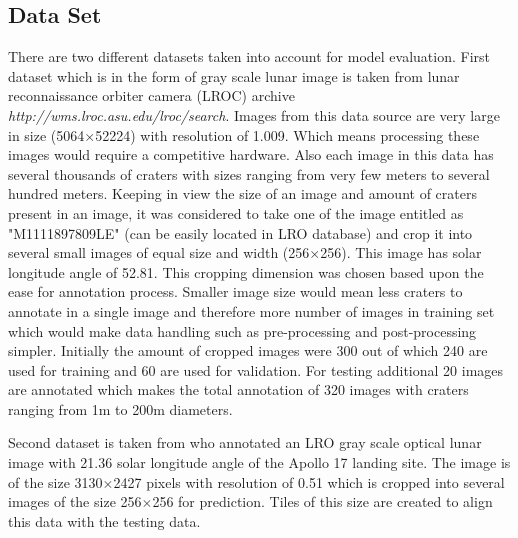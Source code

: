 \documentclass[11pt]{article}
\begin{document}
\subsection{Data Set}
There are two different datasets taken into account for model evaluation. First dataset which is in the form of gray scale lunar image is taken from lunar reconnaissance orbiter camera (LROC) archive \textit{http://wms.lroc.asu.edu/lroc/search}. Images from this data source are very large in size (5064$\times$52224) with resolution of 1.009. Which means processing these images would require a competitive hardware. Also each image in this data has several thousands of craters with sizes ranging from very few meters to several hundred meters. Keeping in view the size of an image and amount of craters present in an image, it was considered to take one of the image entitled as "M1111897809LE" (can be easily located in LRO database) and crop it into several small images of equal size and width (256$\times$256). This image has solar longitude angle of 52.81\textdegree. This cropping dimension was chosen based upon the ease for annotation process. Smaller image size would mean less craters to annotate in a single image and therefore more number of images in training set which would make data handling such as pre-processing and post-processing simpler. Initially the amount of cropped images were 300 out of which 240 are used for training and 60 are used for validation. For testing additional 20 images are annotated which makes the total annotation of 320 images with craters ranging from 1m to 200m diameters. 

Second dataset is taken from \cite{dino2020} who annotated an LRO gray scale optical lunar image with 21.36\textdegree{} solar longitude angle of the Apollo 17 landing site. The image is of the size 3130$\times$2427 pixels with resolution of 0.51 which is cropped into several images of the size 256$\times$256 for prediction. Tiles of this size are created to align this data with the testing data.

\end{document}
